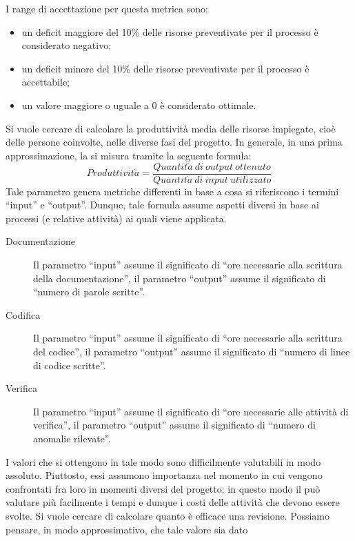 I range di accettazione per questa metrica sono:
\begin{itemize}
\item un deficit maggiore del 10\% delle risorse preventivate per il processo è considerato negativo;
\item un deficit minore del 10\% delle risorse preventivate per il processo è accettabile;
\item un valore maggiore o uguale a 0 è considerato ottimale.
\end{itemize}
					Si vuole cercare di calcolare la produttività media delle risorse impiegate, cioè delle persone coinvolte, nelle diverse fasi del 
					progetto. In generale, in una prima approssimazione, la si misura tramite la seguente formula:
					\begin{equation} \label{eq:produttivita}						
						Produttivit\grave{a} = \frac{Quantit\grave{a}\ di\ output\ ottenuto}{Quantit\grave{a}\ di\ input\ utilizzato}
					\end{equation}
					Tale parametro genera metriche differenti in base a cosa si riferiscono i termini “input” e “output”. Dunque, tale formula assume 
					aspetti diversi in base ai processi (e relative attività) ai quali viene applicata.
					\begin{description}
						\item[Documentazione] Il parametro “input” assume il significato di “ore necessarie alla scrittura della documentazione”, il parametro “output” assume il significato di “numero di parole scritte”.
						\item[Codifica] Il parametro “input” assume il significato di “ore necessarie alla scrittura del codice”, il parametro “output” assume il significato di “numero di linee di codice scritte”.
						\item[Verifica] Il parametro “input” assume il significato di “ore necessarie alle attività di verifica”, il parametro “output” assume il significato di “numero di anomalie rilevate”.
					\end{description}
					I valori che si ottengono in tale modo sono difficilmente valutabili in modo assoluto. Piuttosto, essi assumono importanza nel 
					momento in cui vengono confrontati fra loro in momenti diversi del progetto: in questo modo il  può valutare 
					più facilmente i tempi e dunque i costi delle attività che devono essere svolte.
					Si vuole cercare di calcolare quanto è efficace una revisione. Possiamo pensare, in modo approssimativo, che tale valore sia dato 
